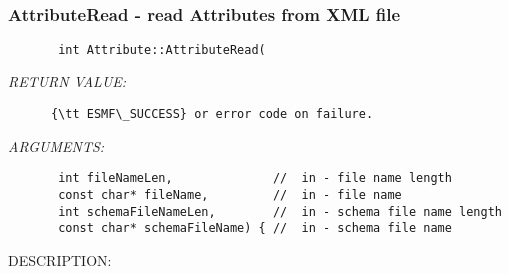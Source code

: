  
\setlength{\oldparskip}{\parskip}
\setlength{\parskip}{1.5ex}
\setlength{\oldparindent}{\parindent}
\setlength{\parindent}{0pt}
\setlength{\oldbaselineskip}{\baselineskip}
\setlength{\baselineskip}{11pt}
 
\def\bv{\begin{verbatim}}
\def\ev{\end{verbatim}}
\def\be{\begin{equation}}
\def\ee{\end{equation}}
\def\bea{\begin{eqnarray}}
\def\eea{\end{eqnarray}}
\def\bi{\begin{itemize}}
\def\ei{\end{itemize}}
\def\bn{\begin{enumerate}}
\def\en{\end{enumerate}}
\def\bd{\begin{description}}
\def\ed{\end{description}}
\def\({\left (}
\def\){\right )}
\def\[{\left [}
\def\]{\right ]}
\def\<{\left  \langle}
\def\>{\right \rangle}
\def\cI{{\cal I}}
\def\diag{\mathop{\rm diag}}
\def\tr{\mathop{\rm tr}}


 

  
 
\mbox{}\hrulefill\
 
\subsubsection [AttributeRead] {AttributeRead - read Attributes from XML file}


  
\begin{verbatim}       int Attribute::AttributeRead(\end{verbatim}{\em RETURN VALUE:}
\begin{verbatim}      {\tt ESMF\_SUCCESS} or error code on failure.\end{verbatim}{\em ARGUMENTS:}
\begin{verbatim}       int fileNameLen,              //  in - file name length
       const char* fileName,         //  in - file name
       int schemaFileNameLen,        //  in - schema file name length
       const char* schemaFileName) { //  in - schema file name
 \end{verbatim}
{\sf DESCRIPTION:\\ }


